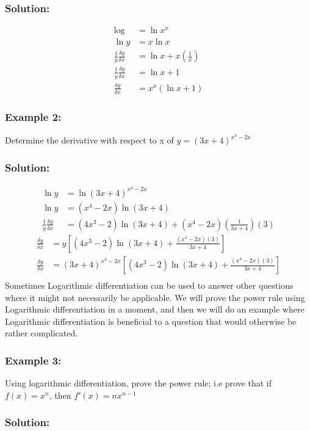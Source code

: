 \documentclass{article}
\begin{document}
\subsubsection*{Solution: }
\begin{align*}
    \log &= \ln x^x\\
    \ln y &=x\ln x\\
    \frac{1}{y} \frac{\delta y}{\delta x} &=\ln x +x\left(\frac{1}{x}\right)\\
    \frac{1}{y} \frac{\delta y}{\delta x} &=\ln x+1\\
    \frac{\delta y}{\delta x}&=x^x(\ln x+1)
\end{align*}
\subsubsection*{Example 2:}
Determine the derivative with respect to x of $y=(3x+4)^{x^4-2x}$
\subsubsection*{Solution: }
\begin{align*}
    \ln y &=\ln (3x+4)^{x^4-2x}\\
    \ln y &=(x^4-2x) \ln(3x+4)\\
    \frac{1}{y}\frac{\delta y}{\delta x}&=(4x^3-2)\ln(3x+4)+(x^4-2x)\left(\frac{1}{3x+4}\right)(3)   
\end{align*}
    \begin{align*}
    \frac{\delta y}{\delta x}&=y\left[(4x^3-2)\ln(3x+4)+\frac{(x^4-2x)(3)}{3x+4}\right]\\
    \frac{\delta y}{\delta x}&=(3x+4)^{x^4-2x}\left[(4x^3-2)\ln(3x+4)+\frac{(x^4-2x)(3)}{3x+4}\right]\\ 
    \end{align*}
    Sometimes Logarithmic differentiation can be used to answer other questions where it might not necessarily be applicable.
    We will prove the power rule using Logarithmic differentiation in a moment, and then we will do an example where Logarithmic differentiation is beneficial to a question that would otherwise be rather complicated.
\subsubsection*{Example 3:}
    Using logarithmic differentiation, prove the power rule; i.e prove that if $f(x)=x^n$, then $f'(x)=nx^{n-1}$
\subsubsection*{Solution: }
\end{document}
